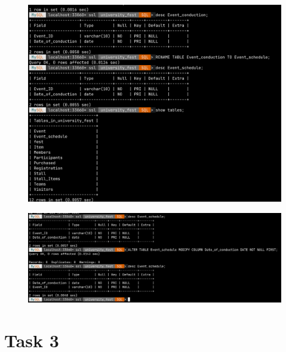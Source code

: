 \documentclass{article}
\begin{document}
\begin{figure}[H]
    \centering
    \includegraphics[width=0.7\linewidth]{images/task 2/4.png}
\end{figure}

\begin{figure}[H]
    \centering
    \includegraphics[width=0.7\linewidth]{images/task 2/5.png}
\end{figure}

\section{Task 3}
\end{document}
